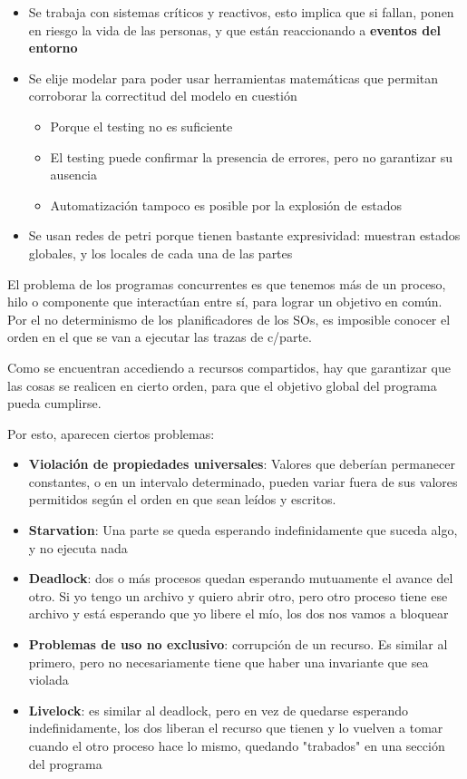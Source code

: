 \begin{itemize}
  \item Se trabaja con sistemas críticos y reactivos, esto implica que si fallan, ponen en riesgo la vida de las personas, y que están reaccionando a \textbf{eventos del entorno}
  \item Se elije modelar para poder usar herramientas matemáticas que permitan corroborar la correctitud del modelo en cuestión
  \begin{itemize}
    \item Porque el testing no es suficiente
    \item El testing puede confirmar la presencia de errores, pero no garantizar su ausencia
    \item Automatización tampoco es posible por la explosión de estados
  \end{itemize}
  \item Se usan redes de petri porque tienen bastante expresividad: muestran estados globales, y los locales de cada una de las partes
\end{itemize}

El problema de los programas concurrentes es que tenemos más de un proceso, hilo o componente que interactúan entre sí, para lograr un objetivo en común. Por el no determinismo de los planificadores de los SOs, es imposible conocer el orden en el que se van a ejecutar las trazas de c/parte.

Como se encuentran accediendo a recursos compartidos, hay que garantizar que las cosas se realicen en cierto orden, para que el objetivo global del programa pueda cumplirse.

Por esto, aparecen ciertos problemas:
\begin{itemize}
  \item \textbf{Violación de propiedades universales}: Valores que deberían permanecer constantes, o en un intervalo determinado, pueden variar fuera de sus valores permitidos según el orden en que sean leídos y escritos.
  \item \textbf{Starvation}: Una parte se queda esperando indefinidamente que suceda algo, y no ejecuta nada
  \item \textbf{Deadlock}: dos o más procesos quedan esperando mutuamente el avance del otro. Si yo tengo un archivo y quiero abrir otro, pero otro proceso tiene ese archivo y está esperando que yo libere el mío, los dos nos vamos a bloquear
  \item \textbf{Problemas de uso no exclusivo}: corrupción de un recurso. Es similar al primero, pero no necesariamente tiene que haber una invariante que sea violada
  \item \textbf{Livelock}: es similar al deadlock, pero en vez de quedarse esperando indefinidamente, los dos liberan el recurso que tienen y lo vuelven a tomar cuando el otro proceso hace lo mismo, quedando "trabados" en una sección del programa
\end{itemize}

